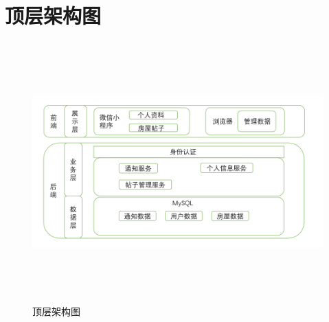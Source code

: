 
\chapter{顶层架构图}

\begin{figure}[htbp]

    \centering
    
    \includegraphics[height=10.0cm,width=14.0cm]{requirement/figures/dingcengjiagou.png} 
    
    \caption{顶层架构图}
    
    \end{figure}